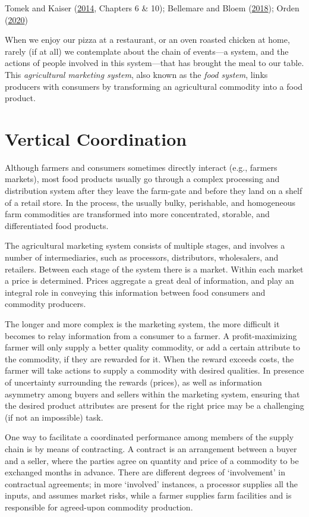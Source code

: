 \documentclass[
]{book}
\begin{document}
Tomek and Kaiser (\protect\hyperlink{ref-tomek2014}{2014}, Chapters 6 \& 10); Bellemare and Bloem (\protect\hyperlink{ref-bellemare2018}{2018}); Orden (\protect\hyperlink{ref-orden2020}{2020})

When we enjoy our pizza at a restaurant, or an oven roasted chicken at home, rarely (if at all) we contemplate about the chain of events---a system, and the actions of people involved in this system---that has brought the meal to our table. This \emph{agricultural marketing system}, also known as the \emph{food system}, links producers with consumers by transforming an agricultural commodity into a food product.

\hypertarget{vertical-coordination}{%
\section{Vertical Coordination}\label{vertical-coordination}}

Although farmers and consumers sometimes directly interact (e.g., farmers markets), most food products usually go through a complex processing and distribution system after they leave the farm-gate and before they land on a shelf of a retail store. In the process, the usually bulky, perishable, and homogeneous farm commodities are transformed into more concentrated, storable, and differentiated food products.

The agricultural marketing system consists of multiple stages, and involves a number of intermediaries, such as processors, distributors, wholesalers, and retailers. Between each stage of the system there is a market. Within each market a price is determined. Prices aggregate a great deal of information, and play an integral role in conveying this information between food consumers and commodity producers.

The longer and more complex is the marketing system, the more difficult it becomes to relay information from a consumer to a farmer. A profit-maximizing farmer will only supply a better quality commodity, or add a certain attribute to the commodity, if they are rewarded for it. When the reward exceeds costs, the farmer will take actions to supply a commodity with desired qualities. In presence of uncertainty surrounding the rewards (prices), as well as information asymmetry among buyers and sellers within the marketing system, ensuring that the desired product attributes are present for the right price may be a challenging (if not an impossible) task.

One way to facilitate a coordinated performance among members of the supply chain is by means of contracting. A contract is an arrangement between a buyer and a seller, where the parties agree on quantity and price of a commodity to be exchanged months in advance. There are different degrees of `involvement' in contractual agreements; in more `involved' instances, a processor supplies all the inputs, and assumes market risks, while a farmer supplies farm facilities and is responsible for agreed-upon commodity production.
\end{document}
